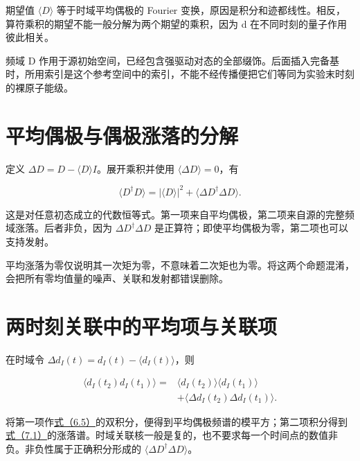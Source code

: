 \documentclass[UTF8,a4paper,zihao=-4,openany,fontset=fandol]{ctexbook}
\begin{document}
期望值 $\langle D\rangle$ 等于时域平均偶极的 Fourier 变换，原因是积分和迹都线性。相反，算符乘积的期望不能一般分解为两个期望的乘积，因为 d 在不同时刻的量子作用彼此相关。



频域 D 作用于源初始空间，已经包含强驱动对态的全部缀饰。后面插入完备基时，所用索引是这个参考空间中的索引，不能不经传播便把它们等同为实验末时刻的裸原子能级。



\section{平均偶极与偶极涨落的分解}\label{sec:07:2}


定义 $\Delta D=D-\langle D\rangle I$。展开乘积并使用 $\langle\Delta D\rangle=0$，有



\begin{equation*}
\langle D^\dagger D\rangle
=|\langle D\rangle|^2+
\langle\Delta D^\dagger\Delta D\rangle.
\tag{7.1}\label{eq:7.1}
\end{equation*}


这是对任意初态成立的代数恒等式。第一项来自平均偶极，第二项来自源的完整频域涨落。后者非负，因为 $\Delta D^\dagger\Delta D$ 是正算符；即使平均偶极为零，第二项也可以支持发射。



平均涨落为零仅说明其一次矩为零，不意味着二次矩也为零。将这两个命题混淆，会把所有零均值量的噪声、关联和发射都错误删除。



\section{两时刻关联中的平均项与关联项}\label{sec:07:3}


在时域令 $\Delta d_I(t)=d_I(t)-\langle d_I(t)\rangle$，则



\begin{equation*}
\begin{aligned}
\langle d_I(t_2)d_I(t_1)\rangle
={}&\langle d_I(t_2)\rangle\langle d_I(t_1)\rangle\\
&+\langle\Delta d_I(t_2)\Delta d_I(t_1)\rangle.
\end{aligned}
\tag{7.2}\label{eq:7.2}
\end{equation*}


将第一项作\hyperref[eq:6.5]{式（6.5）}的双积分，便得到平均偶极频谱的模平方；第二项积分得到\hyperref[eq:7.1]{式（7.1）}的涨落谱。时域关联核一般是复的，也不要求每一个时间点的数值非负。非负性属于正确积分形成的 $\langle\Delta D^\dagger\Delta D\rangle$。
\end{document}
